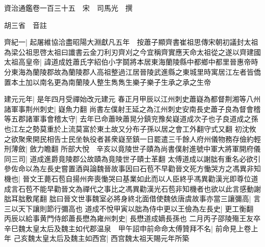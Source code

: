 






























































資治通鑑卷一百三十五　宋　司馬光　撰

胡三省　音註

齊紀一|{
	起屠維協洽盡昭陽大淵獻凡五年　按蕭子顯齊書崔祖思傳宋朝初議封太祖為梁公祖思啓太祖曰䜟書云金刀利刃齊刈之今宜稱齊實應天命太祖從之遂以齊建國}
太祖高皇帝|{
	諱道成姓蕭氏字紹伯小字鬬將本居東海蘭陵縣中都鄉中都里晉惠帝時分東海為蘭陵郡故為蘭陵郡人高祖整過江居晉陵武進縣之東城里時寓居江左者皆僑置本土加以南名更為南蘭陵人整生雋雋生樂子樂子生承之承之生帝}


建元元年|{
	是年四月受禪始改元建元}
春正月甲辰以江州刺史蕭嶷為都督荆湘等八州諸軍事荆州刺史|{
	嶷魚力翻}
尚書左僕射王延之為江州刺史安南長史蕭子良為督會稽等五郡諸軍事會稽太守|{
	去年已命蕭映蕭晃分鎮兖豫矣嶷道成次子也子良道成之孫也江左之勢莫重於上流莫富於東土故又分布子孫以居之會工外翻守式又翻}
初沈攸之欲聚衆開民相告士民坐執役者甚衆嶷至鎮一日罷遣三千餘人府州儀物務存儉約輕刑薄斂|{
	斂力瞻翻}
所部大悅　辛亥以竟陵世子賾為尚書僕射進號中軍大將軍開府儀同三司|{
	道成進爵竟陵郡公故賾為竟陵世子賾士革翻}
太傅道成以謝朏有重名必欲引參佐命以為左長史嘗置酒與論魏晉故事因曰石苞不早勸晉文死方慟哭方之馮異非知機也|{
	晉文王薨石苞自揚州奔喪慟哭曰基業如此而以人臣終乎馮異勸漢光即尊位道成言石苞不能早勸晉文為禪代之事比之馮異勸漢光石苞非知機者也欲以此言感動謝朏耳朏敷尾翻}
朏曰晉文世事魏室必將身終北面借使魏依唐虞故事亦當三讓彌高|{
	言三以天下讓則節行彌高也}
道成不悅甲寅以朏為侍中更以王儉為左長史|{
	更工衡翻}
丙辰以給事黄門侍郎蕭長懋為雍州刺史|{
	長懋道成嫡長孫也}
二月丙子邵陵殤王友卒　辛巳魏太皇太后及魏主如代郡温泉　甲午詔申前命命太傅贊拜不名|{
	前命見上卷上年}
己亥魏太皇太后及魏主如西宫|{
	西宫魏太祖天賜元年所築}



